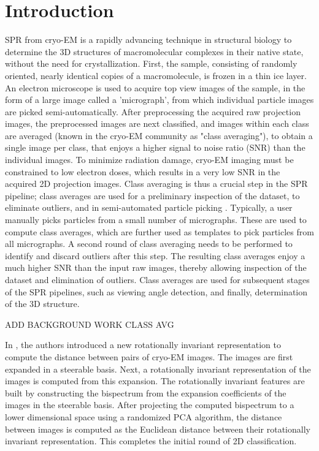 \documentclass{article}
\begin{document}
\section{Introduction}
\label{sec:intro}
SPR from cryo-EM is a rapidly advancing technique in structural biology to determine
the 3D structures of macromolecular complexes in their native state,
 without the need for crystallization. First, the sample, consisting of randomly oriented, nearly identical copies of a macromolecule, is frozen in a thin ice layer. An electron microscope is used to acquire top view images of the sample, in the form of a large image called a 'micrograph', from which individual particle images are picked semi-automatically. After preprocessing the acquired raw projection images, the preprocessed images are next classified, and images within each class are averaged (known in the cryo-EM community as "class averaging"), to obtain a single image per class, that enjoys a higher signal to noise ratio (SNR) than the individual images. To minimize radiation damage, cryo-EM imaging must be constrained to low electron doses, which results in a very low SNR in the acquired 2D projection images. Class averaging is thus a crucial step in the SPR pipeline; class averages are used for a preliminary inspection of the dataset, to eliminate outliers, and in semi-automated particle picking \cite{relion}. Typically, a user manually picks particles from a small number of micrographs. These are used to compute class averages, which are further used as templates to pick particles from all micrographs. A second round of class averaging needs to be performed to identify and discard outliers after this step. The resulting class averages enjoy a much higher SNR than the input raw images, thereby allowing inspection of the dataset and elimination of outliers. Class averages are used for subsequent stages of the SPR pipelines, such as viewing angle detection, and finally, determination of the 3D structure.
 
ADD BACKGROUND WORK CLASS AVG 
  
In \cite{zhao}, the authors introduced a new rotationally invariant representation to compute the distance between pairs of cryo-EM images. The images are first expanded in a steerable basis. Next, a rotationally invariant representation of the images is computed from this expansion.
The rotationally invariant features are built by constructing the bispectrum from the expansion coefficients of the images in the steerable basis. After projecting the computed bispectrum to a lower dimensional space using a randomized PCA algorithm, the distance between images is computed as the Euclidean distance between their rotationally invariant representation. This completes the initial round of 2D classification. 
\end{document}
